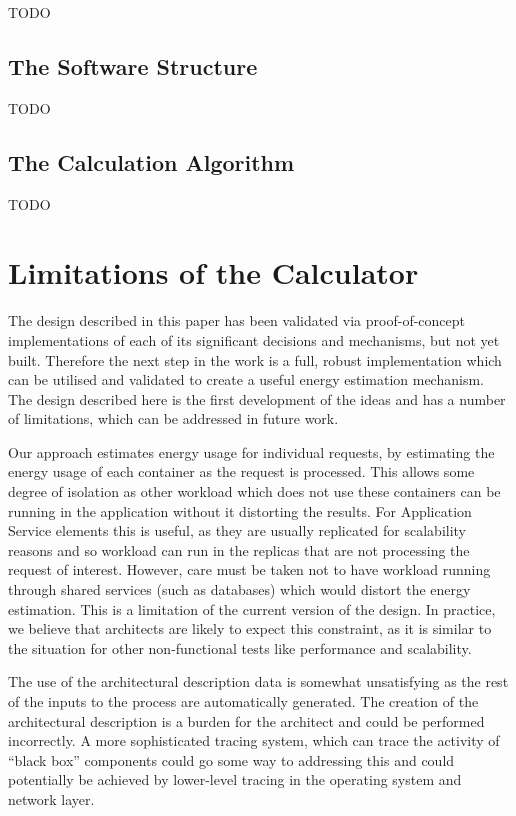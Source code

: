 TODO

\subsection{The Software Structure}

TODO




\subsection{The Calculation Algorithm}

TODO

\section{Limitations of the Calculator}

The design described in this paper has been validated via proof-of-concept implementations of each of its significant decisions and mechanisms, but not yet built.  Therefore the next step in the work is a full, robust implementation which can be utilised and validated to create a useful energy estimation mechanism.
The design described here is the first development of the ideas and has a number of limitations, which can be addressed in future work.

Our approach estimates energy usage for individual requests, by estimating the energy usage of each container as the request is processed.  This allows some degree of isolation as other workload which does not use these containers can be running in the application without it distorting the results.  For Application Service elements this is useful, as they are usually replicated for scalability reasons and so workload can run in the replicas that are not processing the request of interest.  However, care must be taken not to have workload running through shared services (such as databases) which would distort the energy estimation.  This is a limitation of the current version of the design. In practice, we believe that architects are likely to expect this constraint, as it is similar to the situation for other non-functional tests like performance and scalability.

The use of the architectural description data is somewhat unsatisfying as the rest of the inputs to the process are automatically generated.  The creation of the architectural description is a burden for the architect and could be performed incorrectly.  A more sophisticated tracing system, which can trace the activity of “black box” components could go some way to addressing this and could potentially be achieved by lower-level tracing in the operating system and network layer.

